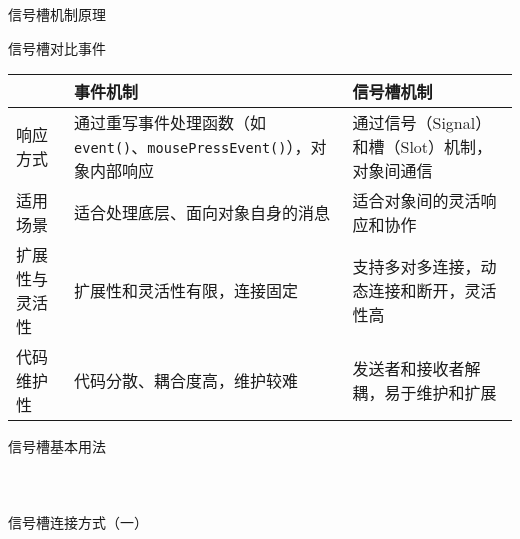 \documentclass[UTF8,aspectratio=169]{beamer}
\begin{document}
\begin{frame}{信号槽机制原理}
    \begin{ytublock}{信号槽对比事件}
        \begin{table}[H]
            \centering
            \begin{tabular}{|p{2.5cm}|p{5.2cm}|p{5.2cm}|}
                \hline
                & \textbf{事件机制} & \textbf{信号槽机制} \\
                \hline
                响应方式 & 通过重写事件处理函数（如 \texttt{event()}、\texttt{mousePressEvent()}），对象内部响应 & 通过信号（Signal）和槽（Slot）机制，对象间通信 \\
                \hline
                适用场景 & 适合处理底层、面向对象自身的消息 & 适合对象间的灵活响应和协作 \\
                \hline
                扩展性与灵活性 & 扩展性和灵活性有限，连接固定 & 支持多对多连接，动态连接和断开，灵活性高 \\
                \hline
                代码维护性 & 代码分散、耦合度高，维护较难 & 发送者和接收者解耦，易于维护和扩展 \\
                \hline
            \end{tabular}
        \end{table}
    \end{ytublock}
\end{frame}

\begin{frame}[fragile]{信号槽基本用法}
    \begin{columns}
        \begin{column}{0.48\textwidth}
            \inputminted[firstline=1,lastline=17]{cpp}{code/qt_signal_slot_example.cpp}
        \end{column}
        \begin{column}{0.48\textwidth}
            \inputminted[firstline=18,lastline=38]{cpp}{code/qt_signal_slot_example.cpp}
        \end{column}
    \end{columns}
\end{frame}

\begin{frame}[fragile]{信号槽连接方式（一）}
    \begin{columns}
        \begin{column}{0.48\textwidth}
            \inputminted[firstline=1,lastline=20]{cpp}{code/qt_connect_example.cpp}
        \end{column}
        \begin{column}{0.48\textwidth}
            \inputminted[firstline=21,lastline=40]{cpp}{code/qt_connect_example.cpp}
        \end{column}
    \end{columns}
\end{frame}
\end{document}

